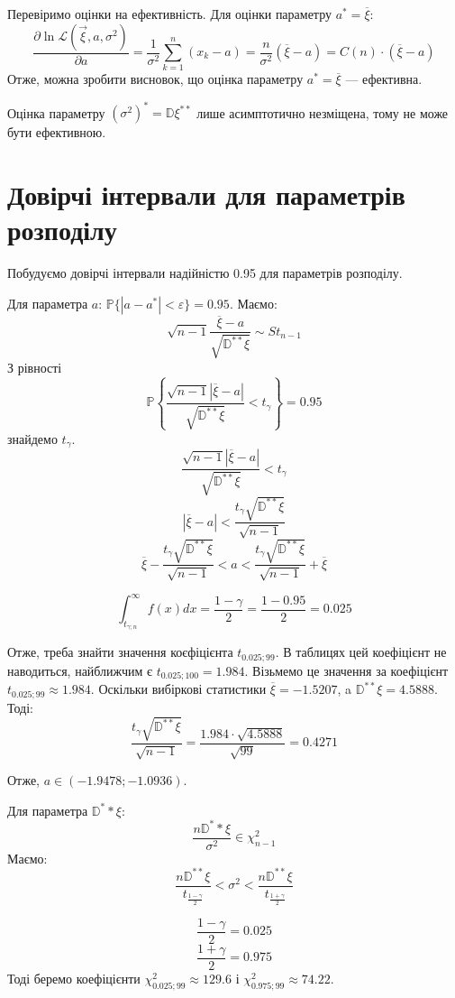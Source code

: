 \documentclass[14pt, a4paper, ukrainian]{extreport}
\begin{document}
	Перевіримо оцінки на ефективність. Для оцінки параметру $a^* = \overline{\xi}$:
	$$\frac{\partial \ln \mathcal{L}(\vec{\xi}, a, \sigma^2)}{\partial a} = \frac{1}{\sigma^2}\sum_{k = 1}^{n}(x_k - a) = \frac{n}{\sigma^2}(\overline{\xi} - a) = C(n)\cdot(\overline{\xi} - a)$$
	Отже, можна зробити висновок, що оцінка параметру $a^* = \overline{\xi}$ --- ефективна.
	
	Оцінка параметру $(\sigma^2)^* = \mathbb{D}\xi^{**}$ лише асимптотично незміщена, тому не може бути ефективною.
	
	\chapter{Довірчі інтервали для параметрів розподілу}
	
	Побудуємо довірчі інтервали надійністю 0.95 для параметрів розподілу. 
	
	Для параметра $a$: $\mathbb{P} \{|a - a^*| < \varepsilon\} = 0.95$. Маємо:
	$$ \sqrt{n - 1} \frac{\overline{\xi} - a}{\sqrt{\mathbb{D}^{**}\xi}} \sim St_{n-1} $$
	З рівності
	$$\mathbb{P}\left\{\frac{\sqrt{n-1}|\overline{\xi} - a|}{\sqrt{\mathbb{D}^{**}\xi}} < t_\gamma\right\} = 0.95$$
	знайдемо $t_\gamma$.
	$$\frac{\sqrt{n-1}|\overline{\xi} - a|}{\sqrt{\mathbb{D}^{**}\xi}} < t_\gamma$$
	$$|\overline{\xi} - a| < \frac{t_\gamma\sqrt{\mathbb{D}^{**}\xi}}{\sqrt{n-1}}$$
	$$\overline{\xi} - \frac{t_\gamma\sqrt{\mathbb{D}^{**}\xi}}{\sqrt{n-1}} < a < \frac{t_\gamma\sqrt{\mathbb{D}^{**}\xi}}{\sqrt{n-1}} + \overline{\xi}$$
	
	$$\int_{t_{\gamma; n}}^{\infty}f(x)dx = \frac{1 - \gamma}{2} = \frac{1 - 0.95}{2} = 0.025$$
	
	Отже, треба знайти значення коєфіцієнта $t_{0.025; 99}$. В таблицях цей коефіцієнт не наводиться, найближчим є $t_{0.025; 100} = 1.984$. Візьмемо це значення за коефіцієнт $t_{0.025; 99} \approx 1.984$. Оскільки вибіркові статистики $\overline{\xi} = -1.5207$, a $\mathbb{D}^{**}\xi = 4.5888$. Тоді:
	$$\frac{t_\gamma\sqrt{\mathbb{D}^{**}\xi}}{\sqrt{n-1}} = \frac{1.984 \cdot \sqrt{4.5888}}{\sqrt{99}} = 0.4271$$

	Отже, $a \in (-1.9478; -1.0936)$.
	
	Для параметра $\mathbb{D}^**\xi$:
	$$\frac{n\mathbb{D}^**\xi}{\sigma^2} \in \chi_{n-1}^2$$
	Маємо:
	$$\frac{n\mathbb{D}^{**}\xi}{t_{\frac{1-\gamma}{2}}} < \sigma^2 < \frac{n\mathbb{D}^{**}\xi}{t_{\frac{1+\gamma}{2}}} $$
	
	$$\frac{1-\gamma}{2} = 0.025$$
	$$\frac{1+\gamma}{2} = 0.975$$
	Тоді беремо коефіцієнти $\chi^2_{0.025;99} \approx 129.6$ і $\chi^2_{0.975;99} \approx 74.22$.
	
\end{document}
